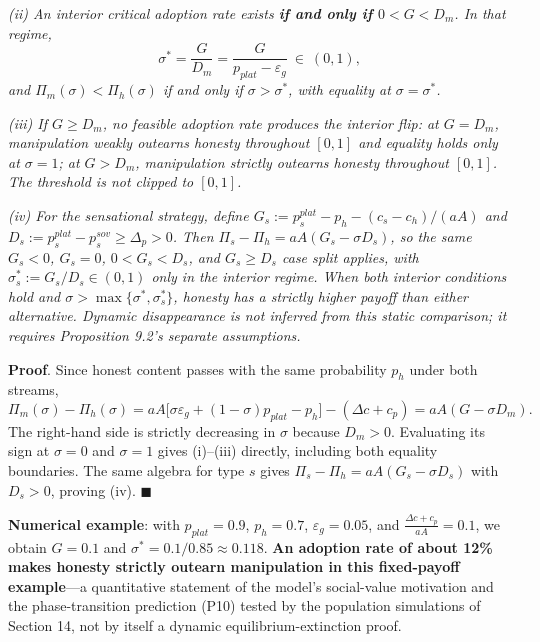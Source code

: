 \documentclass[
  11pt]{article}
\begin{document}
\emph{(ii) An interior critical adoption rate exists \textbf{if and only
if \(0<G<D_m\)}. In that regime,}
\[\sigma^* = \frac{G}{D_m}=\frac{G}{p_{plat} - \varepsilon_g} \ \in\ (0,1),\]
\emph{and \(\Pi_m(\sigma) < \Pi_h(\sigma)\) if and only if
\(\sigma > \sigma^*\), with equality at \(\sigma=\sigma^*\).}

\emph{(iii) If \(G\ge D_m\), no feasible adoption rate produces the
interior flip: at \(G=D_m\), manipulation weakly outearns honesty
throughout \([0,1]\) and equality holds only at \(\sigma=1\); at
\(G>D_m\), manipulation strictly outearns honesty throughout \([0,1]\).
The threshold is not clipped to \([0,1]\).}

\emph{(iv) For the sensational strategy, define
\(G_s:=p_s^{plat}-p_h-(c_s-c_h)/(aA)\) and
\(D_s:=p_s^{plat}-p_s^{sov}\ge\Delta_p>0\). Then
\(\Pi_s-\Pi_h=aA(G_s-\sigma D_s)\), so the same \(G_s<0\), \(G_s=0\),
\(0<G_s<D_s\), and \(G_s\ge D_s\) case split applies, with
\(\sigma_s^*:=G_s/D_s\in(0,1)\) only in the interior regime. When both
interior conditions hold and \(\sigma>\max\{\sigma^*,\sigma_s^*\}\),
honesty has a strictly higher payoff than either alternative. Dynamic
disappearance is not inferred from this static comparison; it requires
Proposition 9.2's separate assumptions.}

\textbf{Proof}. Since honest content passes with the same probability
\(p_h\) under both streams,
\[\Pi_m(\sigma) - \Pi_h(\sigma) = aA\big[\sigma\varepsilon_g + (1-\sigma)p_{plat} - p_h\big] - (\Delta c + c_p) = aA(G-\sigma D_m).\]
The right-hand side is strictly decreasing in \(\sigma\) because
\(D_m>0\). Evaluating its sign at \(\sigma=0\) and \(\sigma=1\) gives
(i)--(iii) directly, including both equality boundaries. The same
algebra for type \(s\) gives \(\Pi_s-\Pi_h=aA(G_s-\sigma D_s)\) with
\(D_s>0\), proving (iv). \(\blacksquare\)

\textbf{Numerical example}: with \(p_{plat} = 0.9\), \(p_h = 0.7\),
\(\varepsilon_g = 0.05\), and \(\frac{\Delta c + c_p}{aA} = 0.1\), we
obtain \(G = 0.1\) and \(\sigma^* = 0.1/0.85 \approx 0.118\). \textbf{An
adoption rate of about 12\% makes honesty strictly outearn manipulation
in this fixed-payoff example}---a quantitative statement of the model's
social-value motivation and the phase-transition prediction (P10) tested
by the population simulations of Section 14, not by itself a dynamic
equilibrium-extinction proof.
\end{document}
